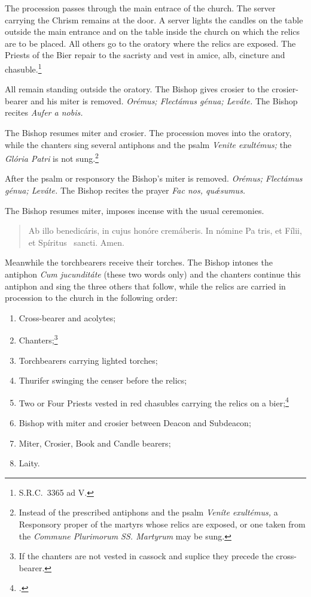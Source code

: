 \documentclass[letterpaper]{report}
\newcommand\blessincense{
\begin{quote}
   Ab illo benedicáris, in cujus honóre cremáberis. In nómine Pa\cross
    tris, et Fí\cross lii, et Spíritus \cross\ sancti. \rbar Amen.
\end{quote}
}
\newcommand\src{\textsc{S.R.C.}}
\begin{document}
{    The procession passes through the main entrace of the church. The server
    carrying the Chrism remains at the door. A server lights the candles on the
    table outside the main entrance and on the table inside the church on which
    the relics are to be placed. All others go to the oratory where the relics
    are exposed. The Priests of the Bier repair to the sacristy and vest in
    amice, alb, cincture and chasuble.\footnote{\src\ 3365 ad V.}

    \rubric All remain standing outside the oratory. The Bishop gives crosier
    to the crosier-bearer and his miter is removed. \textit{Orémus; Flectámus
    génua; Leváte.} The Bishop recites \textit{Aufer a nobis.}

    \rubric The Bishop resumes miter and crosier. The procession moves into the
    oratory, while the chanters sing several antiphons and the psalm
    \textit{Venite exult\'emus;} the \textit{Glória Patri} is not
    sung.\footnote{Instead of the prescribed antiphons and the psalm
    \textit{Ven\'ite exult\'emus,} a Responsory proper of the martyrs whose
    relics are exposed, or one taken from the \textit{Commune Plurimorum SS.
    Martyrum} may be sung.}

    \rubric After the psalm or responsory the Bishop's miter is removed.
    \textit{Orémus; Flectámus génua; Leváte.} The Bishop recites the prayer
    \textit{Fac nos, qu\'\ae sumus.}

    \rubric The Bishop resumes miter, imposes incense with the usual ceremonies.

    \blessincense

    Meanwhile the torchbearers receive their torches. The Bishop intones the
    antiphon \textit{Cum jucundit\'ate} (these two words only) and the chanters
    continue this antiphon and sing the three others that follow, while the
    relics are carried in procession to the church in the following order:

    \begin{enumerate}
        \item Cross-bearer and acolytes;
        \item Chanters;\footnote{If the chanters are not vested in cassock and
            suplice they precede the cross-bearer.}
        \item Torchbearers carrying lighted torches;
        \item Thurifer swinging the censer before the relics;
        \item Two or Four Priests vested in red chasubles carrying the relics
            on a bier;\footcite[Instead of these priets the consecrator may
            carry the relics on a salver.][footnote 1, p. 81.]{consecranda}
        \item Bishop with miter and crosier between Deacon and Subdeacon;
        \item Miter, Crosier, Book and Candle bearers;
        \item Laity.
    \end{enumerate}

}
\end{document}
